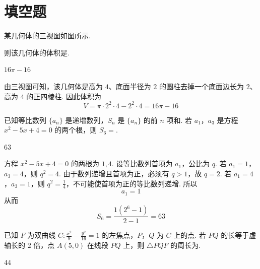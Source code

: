 \section{填空题}

\begin{problem}
某几何体的三视图如图所示.

则该几何体的体积是\fillinblank{}.

\noindent
\leftskip=0pt\relax
{}
\end{problem}

\begin{answer}
\(16\pi - 16\)
\end{answer}

\begin{solution}
由三视图可知，该几何体是高为 \(4\)、底面半径为 \(2\) 的圆柱去掉一个底面边长为 \(2\)、高为 \(4\) 的正四棱柱. 因此体积为
\[
V=\pi\cdot2^2\cdot4-2^2\cdot4=16\pi-16
\]
\end{solution}

\begin{problem}
已知等比数列 \(\{a_n\}\) 是递增数列，\(S_n\) 是 \(\{a_n\}\) 的前 \(n\) 项和. 若 \(a_1\)，\(a_3\) 是方程 \(x^2 - 5x + 4 = 0\) 的两个根，则 \(S_6 =\)\fillinblank{}.
\end{problem}

\begin{answer}
63
\end{answer}

\begin{solution}
方程 \(x^2-5x+4=0\) 的两根为 \(1,4\). 设等比数列首项为 \(a_1\)，公比为 \(q\).
若 \(a_1=1\)，\(a_3=4\)，则 \(q^2=4\). 由于数列递增且首项为正，必须有 \(q>1\)，故 \(q=2\).
若 \(a_1=4\)，\(a_3=1\)，则 \(q^2=\frac{1}{4}\)，不可能使首项为正的等比数列递增. 所以
\[
a_1=1
\]
从而
\[
S_6=\frac{1(2^6-1)}{2-1}=63
\]
\end{solution}

\begin{problem}
已知 \(F\) 为双曲线 \(C:\frac{x^2}{9} - \frac{y^2}{16} = 1\) 的左焦点，\(P\)，\(Q\) 为 \(C\) 上的点. 若 \(PQ\) 的长等于虚轴长的 \(2\) 倍，点 \(A(5,0)\) 在线段 \(PQ\) 上，则 \(\triangle PQF\) 的周长为\fillinblank{}.
\end{problem}

\begin{answer}
44
\end{answer}

